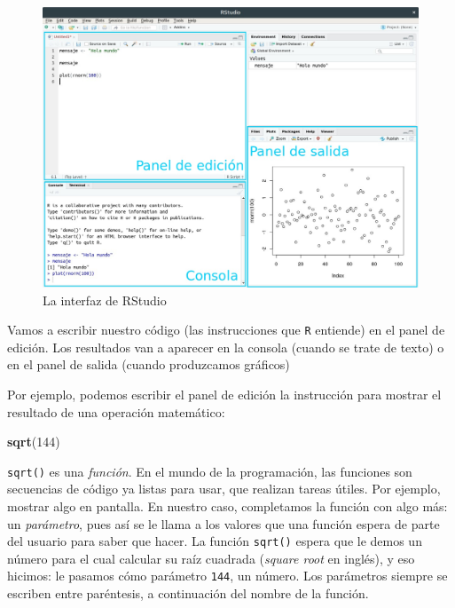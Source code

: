 \documentclass[spanish,]{book}
\newenvironment{Shaded}{\begin{snugshade}}{\end{snugshade}}
\newcommand{\DecValTok}[1]{\textcolor[rgb]{0.00,0.00,0.81}{#1}}
\newcommand{\KeywordTok}[1]{\textcolor[rgb]{0.13,0.29,0.53}{\textbf{#1}}}
\newcommand{\NormalTok}[1]{#1}
\begin{document}
\begin{figure}
\includegraphics[width=1\linewidth]{imagenes/Interfaz_RStudio} \caption{La interfaz de RStudio}\label{fig:unnamed-chunk-6}
\end{figure}

Vamos a escribir nuestro código (las instrucciones que \texttt{R} entiende) en el panel de edición. Los resultados van a aparecer en la consola (cuando se trate de texto) o en el panel de salida (cuando produzcamos gráficos)

Por ejemplo, podemos escribir el panel de edición la instrucción para mostrar el resultado de una operación matemático:

\begin{Shaded}
\begin{Highlighting}[]
\KeywordTok{sqrt}\NormalTok{(}\DecValTok{144}\NormalTok{)}
\end{Highlighting}
\end{Shaded}

\texttt{sqrt()} es una \emph{función}. En el mundo de la programación, las funciones son secuencias de código ya listas para usar, que realizan tareas útiles. Por ejemplo, mostrar algo en pantalla. En nuestro caso, completamos la función con algo más: un \emph{parámetro}, pues así se le llama a los valores que una función espera de parte del usuario para saber que hacer. La función \texttt{sqrt()} espera que le demos un número para el cual calcular su raíz cuadrada (\emph{square root} en inglés), y eso hicimos: le pasamos cómo parámetro \texttt{144}, un número. Los parámetros siempre se escriben entre paréntesis, a continuación del nombre de la función.
\end{document}
